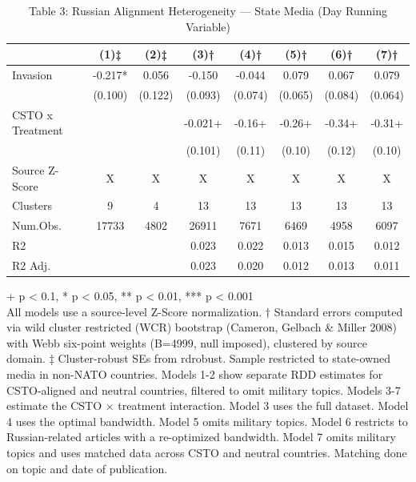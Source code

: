 \begin{table}[!t]
\caption{Table 3: Russian Alignment Heterogeneity — State Media (Day Running Variable)} 
\fontsize{12.0pt}{14.4pt}\selectfont
\begin{tabular*}{\linewidth}{@{\extracolsep{\fill}}lccccccc}
\toprule
  & (1)‡ & (2)‡ & (3)† & (4)† & (5)† & (6)† & (7)† \\ 
\midrule\addlinespace[2.5pt]
Invasion & -0.217* & 0.056 & -0.150 & -0.044 & 0.079 & 0.067 & 0.079 \\ 
 & (0.100) & (0.122) & (0.093) & (0.074) & (0.065) & (0.084) & (0.064) \\ 
CSTO x Treatment &  &  & -0.021+ & -0.16+ & -0.26+ & -0.34+ & -0.31+ \\ 
{} & {} & {} & {(0.101)} & {(0.11)} & {(0.10)} & {(0.12)} & {(0.10)} \\ 
Source Z-Score & X & X & X & X & X & X & X \\ 
Clusters & 9 & 4 & 13 & 13 & 13 & 13 & 13 \\ 
Num.Obs. & 17733 & 4802 & 26911 & 7671 & 6469 & 4958 & 6097 \\ 
R2 &  &  & 0.023 & 0.022 & 0.013 & 0.015 & 0.012 \\ 
R2 Adj. &  &  & 0.023 & 0.020 & 0.012 & 0.013 & 0.011 \\ 
\bottomrule
\end{tabular*}
\begin{minipage}{\linewidth}
+ p < 0.1, * p < 0.05, ** p < 0.01, *** p < 0.001\\
All models use a source-level Z-Score normalization. † Standard errors computed
via wild cluster restricted (WCR) bootstrap (Cameron, Gelbach \& Miller 2008)
with Webb six-point weights (B=4999, null imposed), clustered by source domain.
‡ Cluster-robust SEs from rdrobust. Sample restricted to state-owned media in
non-NATO countries. Models 1-2 show separate RDD estimates for CSTO-aligned
and neutral countries, filtered to omit military topics. Models 3-7 estimate
the CSTO × treatment interaction. Model 3 uses the full dataset. Model 4 uses
the optimal bandwidth. Model 5 omits military topics. Model 6 restricts to
Russian-related articles with a re-optimized bandwidth. Model 7 omits military
topics and uses matched data across CSTO and neutral countries. Matching done on
topic and date of publication.\\
\end{minipage}
\end{table}

